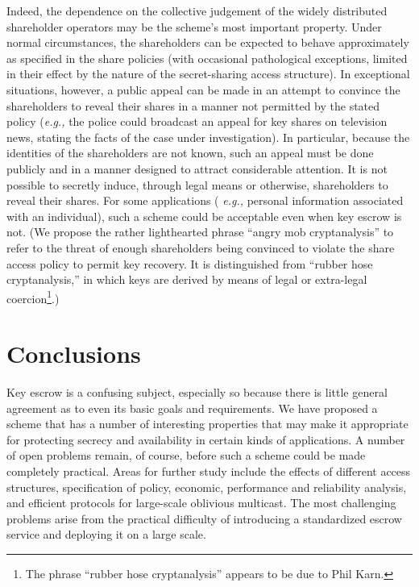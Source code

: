 Indeed, the dependence on the collective judgement of the widely
distributed shareholder operators may be the scheme's most important
property.  Under normal circumstances, the shareholders can be
expected to behave approximately as specified in the share policies
(with occasional pathological exceptions, limited in their effect by
the nature of the secret-sharing access structure).  In exceptional
situations, however, a public appeal can be made in an attempt to
convince the shareholders to reveal their shares in a manner not
permitted by the stated policy ({\em e.g.,} the police could broadcast
an appeal for key shares on television news, stating the facts of the
case under investigation).  In particular, because the identities of
the shareholders are not known, such an appeal must be done publicly
and in a manner designed to attract considerable attention.  It is not
possible to secretly induce, through legal means or otherwise,
shareholders to reveal their shares.  For some applications ({\em
e.g.,} personal information associated with an individual), such a
scheme could be acceptable even when key escrow is not.  (We propose
the rather lighthearted phrase ``angry mob cryptanalysis'' to refer to
the threat of enough shareholders being convinced to violate the share
access policy to permit key recovery.  It is distinguished from
``rubber hose cryptanalysis,'' in which keys are derived by means of
legal or extra-legal coercion\footnote{The phrase ``rubber hose
cryptanalysis'' appears to be due to Phil Karn.}.)


\section{Conclusions}

Key escrow is a confusing subject, especially so because there is
little general agreement as to even its basic goals and requirements.
We have proposed a scheme that has a number of interesting properties
that may make it appropriate for protecting secrecy and availability
in certain kinds of applications.  A number of open problems remain,
of course, before such a scheme could be made completely practical.
Areas for further study include the effects of different access
structures, specification of policy, economic, performance and
reliability analysis, and efficient protocols for large-scale
oblivious multicast.  The most challenging problems arise from the
practical difficulty of introducing a standardized escrow service and
deploying it on a large scale.

